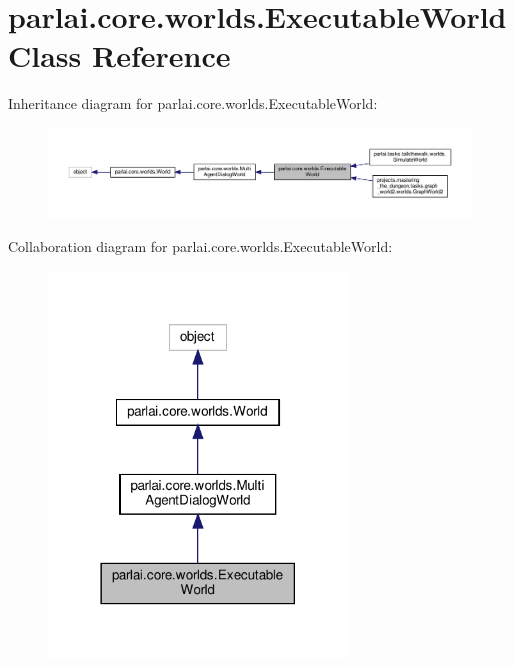 \hypertarget{classparlai_1_1core_1_1worlds_1_1ExecutableWorld}{}\section{parlai.\+core.\+worlds.\+Executable\+World Class Reference}
\label{classparlai_1_1core_1_1worlds_1_1ExecutableWorld}


Inheritance diagram for parlai.\+core.\+worlds.\+Executable\+World\+:\nopagebreak
\begin{figure}[H]
\begin{center}
\leavevmode
\includegraphics[width=350pt]{de/d9f/classparlai_1_1core_1_1worlds_1_1ExecutableWorld__inherit__graph}
\end{center}
\end{figure}


Collaboration diagram for parlai.\+core.\+worlds.\+Executable\+World\+:\nopagebreak
\begin{figure}[H]
\begin{center}
\leavevmode
\includegraphics[width=225pt]{d8/da3/classparlai_1_1core_1_1worlds_1_1ExecutableWorld__coll__graph}
\end{center}
\end{figure}
